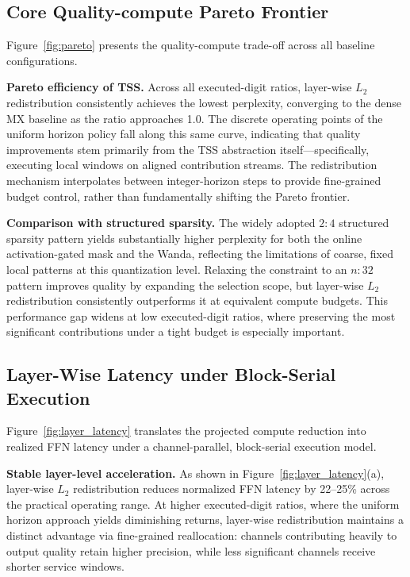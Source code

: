 \documentclass[sigconf]{acmart}
\begin{document}
\subsection{Core Quality-compute Pareto Frontier}
\label{sec:pareto}

Figure~\ref{fig:pareto} presents the quality-compute trade-off across all baseline configurations.

\textbf{Pareto efficiency of TSS.}
Across all executed-digit ratios, layer-wise $L_2$ redistribution consistently achieves the lowest perplexity, converging to the dense MX baseline as the ratio approaches 1.0. The discrete operating points of the uniform horizon policy fall along this same curve, indicating that quality improvements stem primarily from the TSS abstraction itself---specifically, executing local windows on aligned contribution streams. The redistribution mechanism interpolates between integer-horizon steps to provide fine-grained budget control, rather than fundamentally shifting the Pareto frontier.

\textbf{Comparison with structured sparsity.}
The widely adopted $2{:}4$ structured sparsity pattern yields substantially higher perplexity for both the online activation-gated mask and the Wanda, reflecting the limitations of coarse, fixed local patterns at this quantization level. Relaxing the constraint to an $n{:}32$ pattern improves quality by expanding the selection scope, but layer-wise $L_2$ redistribution consistently outperforms it at equivalent compute budgets. This performance gap widens at low executed-digit ratios, where preserving the most significant contributions under a tight budget is especially important.


\subsection{Layer-Wise Latency under Block-Serial Execution}
\label{sec:layer_latency}

Figure~\ref{fig:layer_latency} translates the projected compute reduction into realized FFN latency under a channel-parallel, block-serial execution model.



\textbf{Stable layer-level acceleration.}
As shown in Figure~\ref{fig:layer_latency}(a), layer-wise $L_2$ redistribution reduces normalized FFN latency by 22--25\% across the practical operating range. At higher executed-digit ratios, where the uniform horizon approach yields diminishing returns, layer-wise redistribution maintains a distinct advantage via fine-grained reallocation: channels contributing heavily to output quality retain higher precision, while less significant channels receive shorter service windows.
\end{document}
